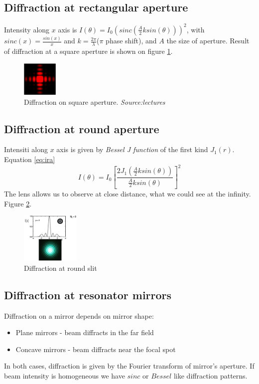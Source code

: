 \subsection{Diffraction at rectangular aperture}
Intensity along $x$ axis is $I(\theta) = I_0 (sinc(\frac{A}{2} k sin(\theta)))^2$, with $sinc(x) = \frac{sin(x)}{x}$ 
and $k = \frac{2\pi}{\lambda}$($\pi$ phase shift), and $A$ the size of aperture.
Result of diffraction at a square aperture is shown on figure \ref{fig:squareaprture}.
\begin{figure}[h!]
    \centering
    \includegraphics[width=0.15\textwidth]{slike/squareAdiff.png}
    \caption{Diffraction on square aperture. \textit{Source:lectures}}
    \label{fig:squareaprture}
\end{figure}

\subsection{Diffraction at round aperture}
Intensiti along $x$ axis is given by \textit{Bessel J function} of the first kind $J_1(r)$. Equation \ref{eq:ira}
\begin{equation}
    I(\theta) = I_0 \left[\frac{2 J_1(\frac{A}{2} k sin(\theta))}{\frac{A}{2} k sin(\theta)}\right]^2
    \label{eq:ira}
\end{equation}
The lens allows us to observe at close distance, what we could see at the infinity. Figure \ref{fig:radf}.
\begin{figure}[h!]
    \centering
    \includegraphics[width=0.25\textwidth]{slike/difSslt.png}
    \caption{Diffraction at round slit}
    \label{fig:radf}
\end{figure}

\subsection{Diffraction at resonator mirrors}
Diffraction on a mirror depends on mirror shape:
\begin{itemize}
    \item Plane mirrors - beam diffracts in the far field
    \item Concave mirrors - beam diffracts near the focal spot
\end{itemize}
In both cases, diffraction is given by the Fourier transform of mirror's aperture.
If beam intensity is homogeneous we have $sinc$ or $Bessel $ like diffraction patterns.

